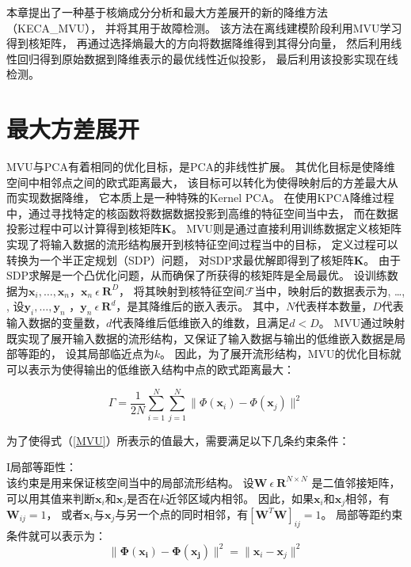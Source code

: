 本章提出了一种基于核熵成分分析和最大方差展开的新的降维方法（KECA\_MVU），
并将其用于故障检测。
该方法在离线建模阶段利用MVU学习得到核矩阵，
再通过选择熵最大的方向将数据降维得到其得分向量，
然后利用线性回归得到原始数据到降维表示的最优线性近似投影，
最后利用该投影实现在线检测。

\section{最大方差展开}
%

MVU与PCA有着相同的优化目标，是PCA的非线性扩展。
其优化目标是使降维空间中相邻点之间的欧式距离最大，
该目标可以转化为使得映射后的方差最大从而实现数据降维，
它本质上是一种特殊的Kernel PCA。
在使用KPCA降维过程中，通过寻找特定的核函数将数据数据投影到高维的特征空间当中去，
而在数据投影过程中可以计算得到核矩阵$\textbf{K}$。
MVU则是通过直接利用训练数据定义核矩阵实现了将输入数据的流形结构展开到核特征空间过程当中的目标，
定义过程可以转换为一个半正定规划（SDP）问题，
对SDP求最优解即得到了核矩阵$\textbf{K}$。
由于SDP求解是一个凸优化问题，从而确保了所获得的核矩阵是全局最优。
设训练数据为$\textbf{x}_i, \ldots, \textbf{x}_n$，$\textbf{x}_n ~ \epsilon~\textbf{R}^D$，
将其映射到核特征空间$\mathcal{F}$当中，映射后的数据表示为, \ldots, ,
设$\textbf{y}_i, \ldots, \textbf{y}_n$ ，$\textbf{y}_n ~ \epsilon~\textbf{R}^d$，是其降维后的嵌入表示。
其中，$N$代表样本数量，$D$代表输入数据的变量数，$d$代表降维后低维嵌入的维数，且满足$d < D$。
MVU通过映射\bm{$\Phi$}既实现了展开输入数据的流形结构，又保证了输入数据与输出的低维嵌入数据是局部等距的，
设其局部临近点为$k$。
因此，为了展开流形结构，MVU的优化目标就可以表示为使得输出的低维嵌入结构中点的欧式距离最大：

\begin{equation}
\label{MVU}
\Gamma= \frac{1}{2N}\sum_{i=1}^{N}\sum_{j=1}^{N}\parallel\Phi(\textbf{x}_i)-\Phi( \textbf{x}_j)\parallel^2
\end{equation}

为了使得式（\ref{MVU}）所表示的值最大，需要满足以下几条约束条件：

\textrm{I}\quad 局部等距性：\\
该约束是用来保证核空间当中的局部流形结构。
设$\mathbf{W}~\epsilon ~\textbf{R}^{N\times N}$ 是二值邻接矩阵，
可以用其值来判断$\textbf{x}_i$和$\textbf{x}_j$是否在$k$近邻区域内相邻。
因此，如果$\textbf{x}_i$和$\textbf{x}_j$相邻，有$\mathbf{W}_{ij}=1$，
或者$\textbf{x}_i$与$\textbf{x}_j$与另一个点的同时相邻，有$[\mathbf{W}^T\mathbf{W}]_{ij}=1$。
局部等距约束条件就可以表示为：
\begin{equation}
\label{iso}
\|\bm{\Phi(\textbf{x}_i)}-\bm{\Phi(\textbf{x}_j)}\|^2=\|\textbf{x}_i-\textbf{x}_j\|^2
\end{equation}

